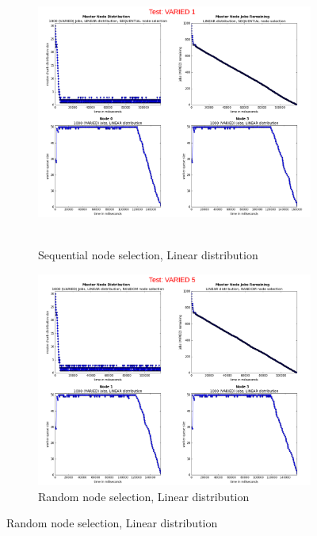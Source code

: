 \documentclass{article}
\begin{document}
\begin{figure} 
  \begin{subfigure}[b]{0.5\linewidth}
    \centering
    \hbox{\hspace{-5.0em} \includegraphics[width=1.2\linewidth]{combined_varied_overview/case_varied_1} }
    \caption{Sequential node selection, Linear distribution}
    \label{testVaried1} 
    \vspace{4ex}
  \end{subfigure}%
  \begin{subfigure}[b]{0.5\linewidth}
    \centering
    \includegraphics[width=1.2\linewidth]{combined_varied_overview/case_varied_5} 
    \caption{Random node selection, Linear distribution} 
    \label{testVaried5} 
    \vspace{4ex}
  \end{subfigure} 
  

\end{figure}
\end{document}
